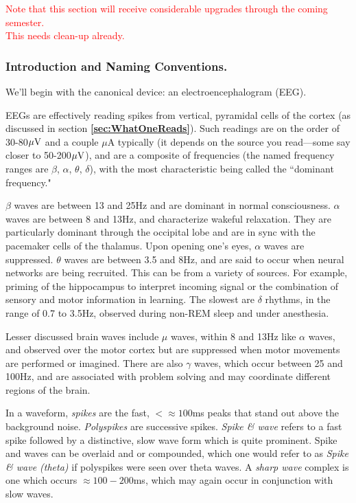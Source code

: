 \textcolor{red}{Note that this section will receive considerable upgrades through the coming semester.} \\

\textcolor{red}{This needs clean-up already.}

\subsubsection{Introduction and Naming Conventions.}

We'll begin with the canonical device: an electroencephalogram (EEG).\newline

EEGs are effectively reading spikes from vertical, pyramidal cells of the cortex (as discussed in section \textbf{\ref{sec:WhatOneReads}}). Such readings are on the order of 30-80$\mu{\rm V}$ and a couple $\mu$A typically (it depends on the source you read---some say closer to 50-200$\mu{\rm V}$), and are a composite of frequencies (the named frequency ranges are $\beta$, $\alpha$, $\theta$, $\delta$), with the most characteristic being called the ``dominant frequency."\newline

$\beta$ waves are between 13 and 25Hz and are dominant in normal consciousness. $\alpha$ waves are between 8 and 13Hz, and characterize wakeful relaxation. They are particularly dominant through the occipital lobe and are in sync with the pacemaker cells of the thalamus. Upon opening one's eyes, $\alpha$ waves are suppressed. $\theta$ waves are between 3.5 and 8Hz, and are said to occur when neural networks are being recruited. This can be from a variety of sources. For example, priming of the hippocampus to interpret incoming signal or the combination of sensory and motor information in learning. The slowest are $\delta$ rhythms, in the range of 0.7 to 3.5Hz, observed during non-REM sleep and under anesthesia.\newline

Lesser discussed brain waves include $\mu$ waves, within 8 and 13Hz like $\alpha$ waves, and observed over the motor cortex but are suppressed when motor movements are performed or imagined. There are also $\gamma$ waves, which occur between 25 and 100Hz, and are associated with problem solving and may coordinate different regions of the brain.\newline

In a waveform, \textit{spikes} are the fast, $<\approx100$ms peaks that stand out above the background noise. \textit{Polyspikes} are successive spikes. \textit{Spike \& wave} refers to a fast spike followed by a distinctive, slow wave form which is quite prominent. Spike and waves can be overlaid and or compounded, which one would refer to as \textit{Spike \& wave (theta)} if polyspikes were seen over theta waves. A \textit{sharp wave} complex is one which occurs $\approx 100-200$ms, which may again occur in conjunction with slow waves. 

